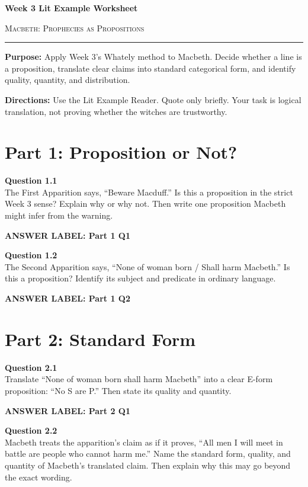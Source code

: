 \documentclass[12pt]{article}
\newcommand{\answerbox}[2]{%
\vspace{0.12em}
\noindent\textbf{#1}\par
\vspace{0.04em}
\noindent\fbox{%
\begin{minipage}[t][#2]{\dimexpr\textwidth-2\fboxsep-2\fboxrule}
\rule{\textwidth}{0pt}
\vspace{#2}
\end{minipage}}
\par\vspace{0.22em}}
\begin{document}
\begin{center}
{\LARGE\bfseries Week 3 Lit Example Worksheet}\par\vspace{0.05em}
{\large\scshape Macbeth: Prophecies as Propositions}\par\vspace{0.12em}
\rule{0.78\textwidth}{0.5pt}
\end{center}

\textbf{Purpose:} Apply Week 3's Whately method to Macbeth. Decide whether a line is a proposition, translate clear claims into standard categorical form, and identify quality, quantity, and distribution.

\textbf{Directions:} Use the Lit Example Reader. Quote only briefly. Your task is logical translation, not proving whether the witches are trustworthy.

\section*{Part 1: Proposition or Not?}

\textbf{Question 1.1}\\[-0.15em]
The First Apparition says, ``Beware Macduff.'' Is this a proposition in the strict Week 3 sense? Explain why or why not. Then write one proposition Macbeth might infer from the warning.

\answerbox{ANSWER LABEL: Part 1 Q1}{2.15in}

\textbf{Question 1.2}\\[-0.15em]
The Second Apparition says, ``None of woman born / Shall harm Macbeth.'' Is this a proposition? Identify its subject and predicate in ordinary language.

\answerbox{ANSWER LABEL: Part 1 Q2}{2.15in}

\newpage

\section*{Part 2: Standard Form}

\textbf{Question 2.1}\\[-0.15em]
Translate ``None of woman born shall harm Macbeth'' into a clear E-form proposition: ``No S are P.'' Then state its quality and quantity.

\answerbox{ANSWER LABEL: Part 2 Q1}{2.15in}

\textbf{Question 2.2}\\[-0.15em]
Macbeth treats the apparition's claim as if it proves, ``All men I will meet in battle are people who cannot harm me.'' Name the standard form, quality, and quantity of Macbeth's translated claim. Then explain why this may go beyond the exact wording.
\end{document}
